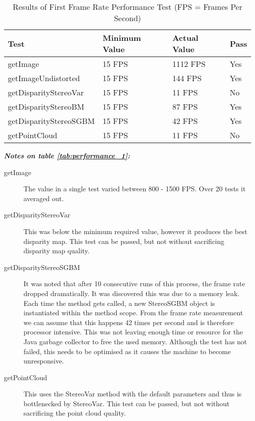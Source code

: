 \begin{table}[h]
\centering
\begin{tabular}{|l|l|l|l|}
\hline
\textbf{Test} & \textbf{Minimum Value} & \textbf{Actual Value} & \textbf{Pass}
\\ \hline
getImage                  & 15 FPS                 & 1112 FPS            & Yes           \\ \hline
getImageUndistorted       & 15 FPS                 & 144 FPS             & Yes           \\ \hline
getDisparityStereoVar     & 15 FPS                 & 11 FPS              & No            \\ \hline
getDisparityStereoBM      & 15 FPS                 & 87 FPS              & Yes           \\ \hline
getDisparityStereoSGBM    & 15 FPS                 & 42 FPS              & Yes           \\ \hline
getPointCloud             & 15 FPS                 & 11 FPS              & No            \\ \hline
\end{tabular}
\caption{Results of First Frame Rate Performance Test (FPS = Frames Per Second)\protect {\label{tab:performance_1}}}
\end{table}

\textbf{\textit{Notes on table \ref{tab:performance_1}:}}
\begin{description}
	\item[getImage] The value in a single test varied between 800 - 1500 FPS.
	Over 20 tests it averaged out.
	\item[getDisparityStereoVar] This was below the minimum required value, however it produces the best disparity map.
	This test can be passed, but not without sacrificing disparity map quality.
	\item[getDisparityStereoSGBM] It was noted that after 10 consecutive runs of this process, the frame rate dropped dramatically.
	It was discovered this was due to a memory leak.
	Each time the method  gets called, a new StereoSGBM object is instantiated within the method scope. From the frame rate measurement we can assume that this happens 42 times per second and is therefore processor intensive. This was not leaving enough time or resource for the Java garbage collector to free the used memory. Although the test has not failed, this needs to be optimised as it causes the machine to become unresponsive.
	\item[getPointCloud] This uses the StereoVar method with the default parameters and thus is bottlenecked by StereoVar.
	This test can be passed, but not without sacrificing the point cloud quality.
	
\end{description}